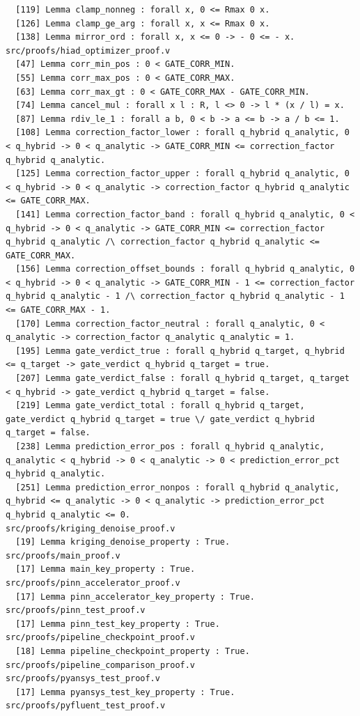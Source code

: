 \documentclass[11pt]{article}
\theoremstyle{definition}
\begin{document}
\begin{verbatim}
  [119] Lemma clamp_nonneg : forall x, 0 <= Rmax 0 x.
  [126] Lemma clamp_ge_arg : forall x, x <= Rmax 0 x.
  [138] Lemma mirror_ord : forall x, x <= 0 -> - 0 <= - x.
src/proofs/hiad_optimizer_proof.v
  [47] Lemma corr_min_pos : 0 < GATE_CORR_MIN.
  [55] Lemma corr_max_pos : 0 < GATE_CORR_MAX.
  [63] Lemma corr_max_gt : 0 < GATE_CORR_MAX - GATE_CORR_MIN.
  [74] Lemma cancel_mul : forall x l : R, l <> 0 -> l * (x / l) = x.
  [87] Lemma rdiv_le_1 : forall a b, 0 < b -> a <= b -> a / b <= 1.
  [108] Lemma correction_factor_lower : forall q_hybrid q_analytic, 0 < q_hybrid -> 0 < q_analytic -> GATE_CORR_MIN <= correction_factor q_hybrid q_analytic.
  [125] Lemma correction_factor_upper : forall q_hybrid q_analytic, 0 < q_hybrid -> 0 < q_analytic -> correction_factor q_hybrid q_analytic <= GATE_CORR_MAX.
  [141] Lemma correction_factor_band : forall q_hybrid q_analytic, 0 < q_hybrid -> 0 < q_analytic -> GATE_CORR_MIN <= correction_factor q_hybrid q_analytic /\ correction_factor q_hybrid q_analytic <= GATE_CORR_MAX.
  [156] Lemma correction_offset_bounds : forall q_hybrid q_analytic, 0 < q_hybrid -> 0 < q_analytic -> GATE_CORR_MIN - 1 <= correction_factor q_hybrid q_analytic - 1 /\ correction_factor q_hybrid q_analytic - 1 <= GATE_CORR_MAX - 1.
  [170] Lemma correction_factor_neutral : forall q_analytic, 0 < q_analytic -> correction_factor q_analytic q_analytic = 1.
  [195] Lemma gate_verdict_true : forall q_hybrid q_target, q_hybrid <= q_target -> gate_verdict q_hybrid q_target = true.
  [207] Lemma gate_verdict_false : forall q_hybrid q_target, q_target < q_hybrid -> gate_verdict q_hybrid q_target = false.
  [219] Lemma gate_verdict_total : forall q_hybrid q_target, gate_verdict q_hybrid q_target = true \/ gate_verdict q_hybrid q_target = false.
  [238] Lemma prediction_error_pos : forall q_hybrid q_analytic, q_analytic < q_hybrid -> 0 < q_analytic -> 0 < prediction_error_pct q_hybrid q_analytic.
  [251] Lemma prediction_error_nonpos : forall q_hybrid q_analytic, q_hybrid <= q_analytic -> 0 < q_analytic -> prediction_error_pct q_hybrid q_analytic <= 0.
src/proofs/kriging_denoise_proof.v
  [19] Lemma kriging_denoise_property : True.
src/proofs/main_proof.v
  [17] Lemma main_key_property : True.
src/proofs/pinn_accelerator_proof.v
  [17] Lemma pinn_accelerator_key_property : True.
src/proofs/pinn_test_proof.v
  [17] Lemma pinn_test_key_property : True.
src/proofs/pipeline_checkpoint_proof.v
  [18] Lemma pipeline_checkpoint_property : True.
src/proofs/pipeline_comparison_proof.v
src/proofs/pyansys_test_proof.v
  [17] Lemma pyansys_test_key_property : True.
src/proofs/pyfluent_test_proof.v

\end{verbatim}
\end{document}
